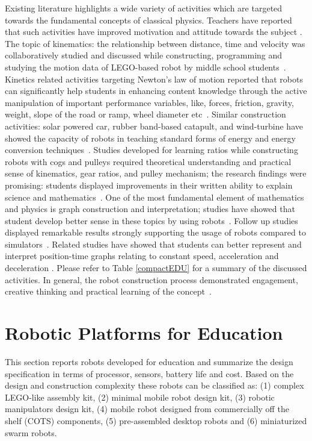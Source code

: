 \documentclass[conference]{IEEEtran}
\begin{document}
Existing literature highlights a wide variety of activities which are targeted towards the fundamental concepts of 
classical physics. Teachers have reported that such activities have improved motivation and attitude towards the subject 
\cite{robinson2005robotics}. The topic of kinematics: the relationship between distance, time and velocity was 
collaboratively studied and discussed while constructing, programming and studying the motion data of LEGO-based robot 
by middle school students~\cite{mitnik2008autonomous, mitnik2009collaborative, mikropoulos2013educational}. Kinetics 
related activities targeting Newton's law of motion reported that robots can significantly help students in enhancing 
content knowledge through the active manipulation of important performance variables, like, forces, friction, gravity, 
weight, slope of the road or ramp, wheel diameter etc~\cite{williams2007acquisition}. Similar construction activities: 
solar powered car, rubber band-based catapult, and wind-turbine have showed the capacity of robots in teaching standard 
forms of energy and energy conversion techniques~\cite{saygin2012design}. Studies developed for learning ratios while 
constructing robots with cogs and pulleys required theoretical understanding and practical sense of kinematics, gear 
ratios, and pulley mechanism; the research findings were promising: students displayed improvements in their written 
ability to explain science and mathematics~\cite{norton2004using}. One of the most fundamental element of mathematics 
and physics is graph construction and interpretation; studies have showed that student develop better sense in these 
topics by using robots~\cite{mitnik2008autonomous}. Follow up studies displayed remarkable results strongly supporting 
the usage of robots compared to simulators~\cite{mitnik2009collaborative}. Related studies have showed that students 
can better represent and interpret position-time graphs relating to constant speed, acceleration and deceleration 
\cite{alimisisrobotics}. Please refer to Table \ref{compactEDU} for a summary of the discussed activities. In 
general, the robot construction process demonstrated engagement, creative thinking and practical learning of the 
concept~\cite{ashdown2012robotics}.

\section{Robotic Platforms for Education}

This section reports robots developed for education and summarize the design specification in terms 
of processor, sensors, battery life and cost. Based on the design and construction complexity these robots can be 
classified as: (1) complex LEGO-like assembly kit, (2) minimal mobile robot design kit, (3) robotic manipulators 
design kit, (4) mobile robot designed from commercially off the shelf (COTS) components, (5) pre-assembled desktop 
robots and (6) miniaturized swarm robots.
\end{document}
